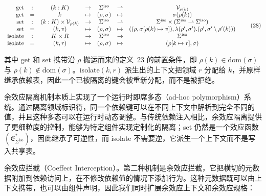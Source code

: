 \documentclass[
  10
]{article}
\begin{document}
\[
\begin{array} { r c c c c c c } { \mathrm { g e t } } & { : } & { ( k : K ) } & { \to } & { \Sigma ^ { \mathrm { i s o } } } & { \rightharpoonup } & { \mathcal { V } _ { \rho ( k ) } } \\ { \mathrm { g e t } } & { = } & { k } & { \mapsto } & { ( \rho , \sigma ) } & { \mapsto } & { \sigma ( \rho ( k ) ) } \\ { \mathrm { s e t } } & { : } & { ( k : K ) \times \mathcal { V } _ { \rho ( k ) } } & { \to } & { \Sigma ^ { \mathrm { i s o } } } & { \rightharpoonup } & { \Sigma ^ { \mathrm { i s o } } \times ( \Sigma ^ { \mathrm { i s o } } \rightharpoonup \Sigma ^ { \mathrm { i s o } } ) } \\ { \mathrm { s e t } } & { = } & { ( k , v ) } & { \mapsto } & { ( \rho , \sigma ) } & { \mapsto } & { ( ( \rho , \sigma [ \rho ( k ) \mapsto v ] ) , \lambda ( \rho ^ { \prime } , \sigma ^ { \prime } ) . ( \rho ^ { \prime } , \sigma ^ { \prime } \setminus \rho ^ { \prime } ( k ) ) ) } \\ { \mathrm { i s o l a t e } } & { : } & { K \times R } & { \to } & { \Sigma ^ { \mathrm { i s o } } } & { \to } & { \Sigma ^ { \mathrm { i s o } } } \\ { \mathrm { i s o l a t e } } & { = } & { ( k , r ) } & { \mapsto } & { ( \rho , \sigma ) } & { \mapsto } & { ( \rho [ k \mapsto r ] , \sigma ) } \end{array}\tag{28}
\]

其中 get 和 set 携带沿 \(\rho\) 搬运而来的定义~23 的前置条件，即 \(\rho ( k ) \in \mathrm { d o m } ( \sigma )\) 与 \(\rho ( k ) \notin \mathrm { d o m } ( \sigma )\)。isolate\(( k , r )\) 派生出的上下文把领域 \(r\) 分配给 \(k\)，并原样继承依赖表，因此一个已被隔离的键会被重新分配，而不是被拒绝。

余效应隔离机制本质上实现了一个运行时即席多态（ad-hoc polymorphism）系统。通过隔离领域标识符，同一个依赖键可以在不同上下文中解析到完全不同的值，并且这种多态可以在运行时动态调整。与传统依赖注入相比，余效应隔离提供了更细粒度的控制，能够为特定组件实现定制化的隔离；set 仍然是一个效应函数 \(\left( \mathfrak { E } _ { \Sigma ^ { \mathrm { { i s o } } } } ^ { * } \right)\)，因此继承了可逆性，而 isolate 不需要逆，它派生一个上下文而不是写入共享表。

余效应拦截（Coeffect Interception）。第二种机制是余效应拦截，它把横切的元数据附加到依赖访问上，在不修改依赖值的情况下添加行为。这种元数据既可以由上下文携带，也可以由组件声明，因此我们同时扩展余效应上下文和余效应规格：
\end{document}
